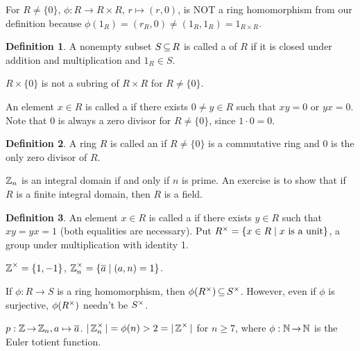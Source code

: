 \documentclass[11pt]{book}
\theoremstyle{definition}   \newtheorem{defn}[counter]{Definition} %
\newtheorem*{defn*}{Definition}
\newcommand{\ov}{\overline}   \newcommand{\wt}{\widetilde}
\DeclareMathOperator{\ra}{\rightarrow}   \DeclareMathOperator{\Poly}{\mathbf{P}}   \DeclareMathOperator{\spn}{\textnormal{span}}   \DeclareMathOperator{\aut}{\textnormal{Aut}}
\newcommand{\vs}{\vspace{8pt}}
\numberwithin{counter}{chapter}
\begin{document}
\vs

\begin{example*}
For $R \ne \{0\}$, $\phi : R \ra R \times R$, $r \mapsto (r,0)$, is NOT a ring homomorphism from our definition because $\phi(1_R) = (r_R,0) \ne (1_R,1_R) = 1_{R \times R}$.
\end{example*}

\vs

\begin{defn*}
A nonempty subset $S \operatorname{\subseteq} R$ is called a  of $R$ if it is closed under addition and multiplication and $1_R \in S$.

\begin{example*}
$R \times \{0\}$ is not a subring of $R \times R$ for $R \ne \{0\}$.
\end{example*}

An element $x \in R$ is called a  if there exists $0 \ne y \in R$ such that $xy = 0$ or $yx = 0$. Note that $0$ is always a zero divisor for $R \ne \{0\}$, since $1 \cdot 0 = 0$.
\end{defn*}

\vs

\begin{defn*}
A ring $R$ is called an  if $R \ne \{0\}$ is a commutative ring and $0$ is the only zero divisor of $R$.

\begin{example*}
$\operatorname{\mathbb{Z}}_n$ is an integral domain if and only if $n$ is prime. An exercise is to show that if $R$ is a finite integral domain, then $R$ is a field.
\end{example*}
\end{defn*}

\vs

\begin{defn*}
An element $x \in R$ is called a  if there exists $y \in R$ such that $xy = yx = 1$ (both equalities are necessary). Put $R^{\times} = \{x \in R \mid x \textnormal{ is a unit}\}$, a group under multiplication with identity 1.

\begin{example*}
$\operatorname{\mathbb{Z}}^{\times} = \{1,-1\}$, $\z_n\x = \{\ov{a} \mid (a,n) = 1\}$.
\end{example*}

If $\phi : R \ra S$ is a ring homomorphism, then $\phi(R^{\times}) \operatorname{\subseteq} S^{\times}$. However, even if $\phi$ is surjective, $\phi(R^{\times})$ needn't be $S^{\times}$.

\begin{example*}
$p : \z \ra \z_n, a \mapsto \ov{a}$. $|\operatorname{\mathbb{Z}}_n^{\times}| = \phi(n) > 2 = |\operatorname{\mathbb{Z}}^{\times}|$ for $n \geq 7$, where $\phi : \N \ra \N$ is the Euler totient function.
\end{example*}
\end{defn*}
\end{document}

